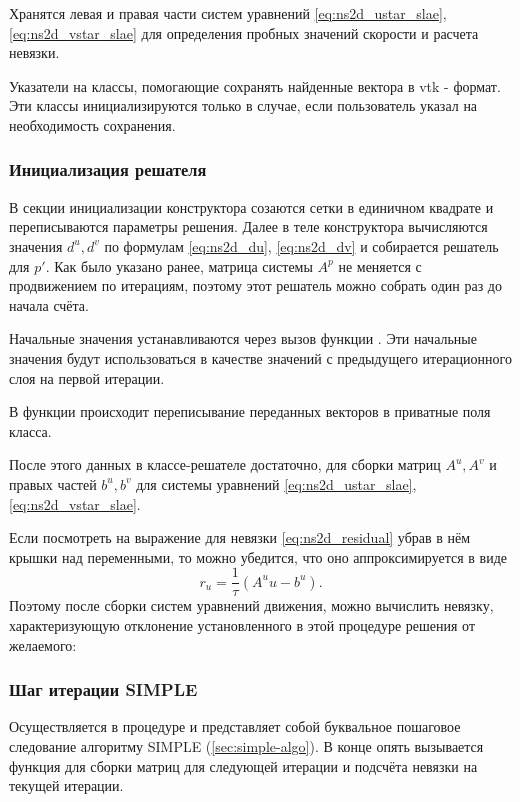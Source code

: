 Хранятся левая и правая части систем уравнений \eqref{eq:ns2d_ustar_slae}, \eqref{eq:ns2d_vstar_slae}
для определения пробных значений скорости и расчета невязки.

Указатели на классы, помогающие сохранять найденные вектора в vtk - формат.
Эти классы инициализируются только в случае, если пользователь указал на 
необходимость сохранения.

\subsubsection{Инициализация решателя}

В секции инициализации конструктора
созаются сетки в единичном квадрате и переписываются параметры решения.
Далее в теле конструктора вычисляются значения
$d^u, d^v$ по формулам \eqref{eq:ns2d_du}, \eqref{eq:ns2d_dv}
и собирается решатель для $p'$. Как было указано ранее,
матрица системы $A^p$ не меняется
с продвижением по итерациям, поэтому этот решатель можно собрать один раз
до начала счёта.


Начальные значения устанавливаются через вызов функции .
Эти начальные значения будут использоваться в качестве значений
с предыдущего итерационного слоя на первой итерации.

В функции происходит переписывание переданных векторов
в приватные поля класса.

После этого данных в классе-решателе достаточно,
для сборки матриц $A^u, A^v$ и правых частей
$b^u, b^v$ для системы уравнений \eqref{eq:ns2d_ustar_slae}, \eqref{eq:ns2d_vstar_slae}.

Если посмотреть на выражение для невязки \eqref{eq:ns2d_residual} убрав в нём крышки над переменными, то можно
убедится, что оно аппроксимируется в виде
\begin{equation*}
    r_u = \frac{1}{\tau}\left(A^u u - b^u\right).
\end{equation*}
Поэтому после сборки систем уравнений движения, можно вычислить невязку, характеризующую
отклонение установленного в этой процедуре решения от желаемого:

\subsubsection{Шаг итерации SIMPLE}
Осуществляется в процедуре
и представляет собой буквальное пошаговое следование алгоритму SIMPLE (\ref{sec:simple-algo}).
В конце опять вызывается функция  для сборки матриц для следующей итерации
и подсчёта невязки на текущей итерации.

